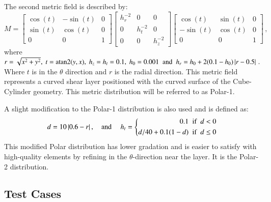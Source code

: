 \documentclass[3p,times,procedia,number]{elsarticle}
\begin{document}
The second metric field is described by: 
\begin{equation}
\label{eq:Polar1}
M = 
\begin{bmatrix}
\cos(t) & -\sin(t) & 0 \\ 
\sin(t) & \cos(t) &  0 \\ 
0   &    0   &  1 
\end {bmatrix}
\begin{bmatrix}
h_r^{-2} &  0  &    0   \\ 
0 &   h_t^{-2} &  0  \\  
0 &   0  &  h_z^{-2} 
\end {bmatrix}
\begin{bmatrix}
\cos(t) & \sin(t) &  0  \\
-\sin(t) & \cos(t) &  0  \\
0  &     0  &    1
\end {bmatrix} \,,
\end{equation}
where
$r = \sqrt{x^2+y^2},\; t = \textrm{atan2}(y,x),\; h_z = h_t = 0.1,\; h_0 = 0.001\textrm{\; and\; } h_r = h_0 + 2 (0.1-h_0) \left|r-0.5\right| \,. $
Where $t$ is in the $\theta$ direction and $r$ is the radial direction.
This metric field represents a curved shear layer positioned with the curved surface of the Cube-Cylinder geometry.
This metric distribution will be referred to as Polar-1.

A slight modification to the Polar-1 distribution is also used
and is defined as:
\begin{equation}
  d = 10 \left|0.6 - r\right|, \textrm{\quad and \quad} h_t =  
  \left\{ 
  \begin{aligned}
  0.1  \textrm{\; if \;} &d < 0 \\
  d / 40 + 0.1 (1 - d)   \textrm{\; if \;}& d \leq 0
  \end{aligned}
  \right.
\end{equation}
This modified Polar distribution has lower gradation and
is easier to satisfy with high-quality elements by refining
in the $\theta$-direction near the layer.
It is the Polar-2 distribution.

\subsection{Test Cases}
\end{document}
